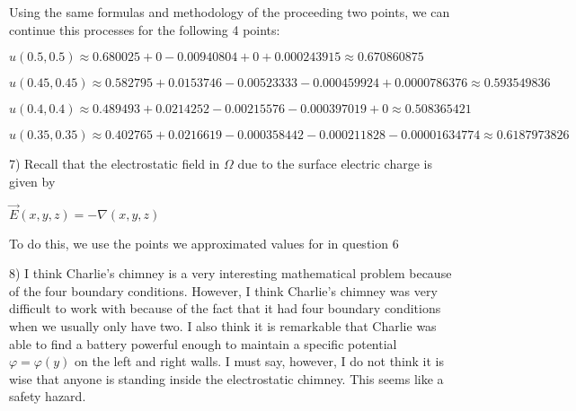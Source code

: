 \documentclass[executivepaper]{article}
\begin{document}
\begin{flushleft}
\begin{center}
\end{center}

Using the same formulas and methodology of the proceeding two points, we can continue this processes for the following 4 points:

\begin{center}

$u(0.5,0.5) \approx 0.680025 + 0 - 0.00940804 + 0 + 0.000243915 \approx 0.670860875$

\vspace{2mm}

$u(0.45,0.45) \approx 0.582795 + 0.0153746 - 0.00523333 - 0.000459924 + 0.0000786376 \approx 0.593549836$

\vspace{2mm}

$u(0.4,0.4) \approx 0.489493 + 0.0214252 - 0.00215576 - 0.000397019 + 0 \approx 0.508365421$

\vspace{2mm}

$u(0.35,0.35) \approx 0.402765 + 0.0216619 - 0.000358442 - 0.000211828 - 0.00001634774 \approx 0.6187973826$

\end{center}

\end{flushleft}

\begin{flushleft}

7) Recall that the electrostatic field in $\Omega$ due to the surface electric charge is given by

\begin{center}

$\vec{E}(x,y,z)=-\nabla(x,y,z)$

\end{center}

To do this, we use the points we approximated values for in question 6

\end{flushleft}

\pagebreak

\begin{flushleft}

8) I think Charlie's chimney is a very interesting mathematical problem because of the four boundary conditions. However, I think Charlie's chimney was very difficult to work with because of the fact that it had four boundary conditions when we usually only have two. I also think it is remarkable that Charlie was able to find a battery powerful enough to maintain a specific potential $\varphi=\varphi(y)$ on the left and right walls. I must say, however, I do not think it is wise that anyone is standing inside the electrostatic chimney. This seems like a safety hazard.

\end{flushleft}
\end{document}
